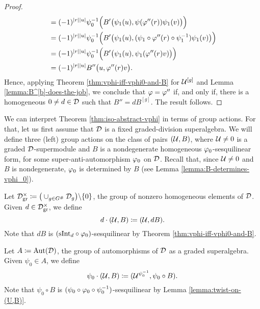\begin{proof}
\begin{align*}
        &= (-1)^{|r||u|} \psi_0^{-1} \Big( B' \big( \psi_1(u), \psi (\varphi''(r)) \psi_1(v) \big) \Big)\\
        &= (-1)^{|r||u|} \psi_0^{-1} \Big( B' \big( \psi_1(u), (\psi_1 \circ \varphi''(r) \circ \psi_1^{-1}) \psi_1(v) \big) \Big)\\
        &= (-1)^{|r||u|} \psi_0^{-1} \Big( B' \big( \psi_1(u), \psi_1 (\varphi''(r) v) \big) \Big)\\
        &= (-1)^{|r||u|} B'' \big( u, \varphi''(r) v\big).
    \end{align*}
    Hence, applying Theorem \ref{thm:vphi-iff-vphi0-and-B} for $\mathcal U^{[g]}$ and Lemma \ref{lemma:B^[b]-does-the-job}, we conclude that $\varphi = \varphi''$ if, and only if, there is a homogeneous $0 \neq d \in \mathcal{D}$ such that $B'' = dB^{[g]}$. 
    The result follows. 
\end{proof}

We can interpret Theorem \ref{thm:iso-abstract-vphi} in terms of group actions. 
For that, let us first assume that $\mathcal{D}$ is a fixed graded-division superalgebra. 
We will define three (left) group actions on the class of pairs $(\mathcal U, B)$, where $\mathcal U \neq 0$ is a graded $\mathcal{D}$-supermodule and $B$ is a nondegenerate homogeneous $\varphi_0$-sesquilinear form, for some super-anti-automorphism $\varphi_0$ on $\mathcal{D}$. 
Recall that, since $\mathcal U \neq 0$ and $B$ is nondegenerate, $\varphi_0$ is determined by $B$ (see Lemma \ref{lemma:B-determines-vphi_0}).

Let $\D^\times_{\mathrm{gr}} \coloneqq \big( \cup_{g \in G^\#} \D_g \big)\backslash \{ 0 \}$, the group of nonzero homogeneous elements of $\mathcal{D}$. 
Given $d\in \mathcal{D}^\times_{\mathrm{gr}}$, we define 
\begin{equation}\label{eq:Dx_gr-action}
    d\cdot (\mathcal U, B) \coloneqq (\mathcal U, dB).
\end{equation}
Note that $dB$ is $(\mathrm{sInt}_d \circ \varphi_0)$-sesquilinear by Theorem \ref{thm:vphi-iff-vphi0-and-B}.

Let $A \coloneqq \operatorname{Aut} (\mathcal{D})$, the group of automorphisms of $\mathcal{D}$ as a graded superalgebra. 
Given $\psi_0 \in A$, we define
\begin{equation}\label{eq:Aut(D)-action}
    \psi_0 \cdot (\mathcal U, B) \coloneqq (\mathcal U^{\psi_0^{-1}}, \psi_0 \circ B).
\end{equation}
Note that $\psi_0 \circ B$ is $(\psi_0 \circ \varphi_0 \circ \psi_0^{-1})$-sesquilinear by Lemma \ref{lemma:twist-on-(U,B)}.

